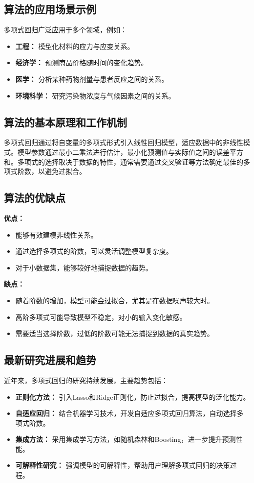\subsection*{算法的应用场景示例}
多项式回归广泛应用于多个领域，例如：
\begin{itemize}
    \item \textbf{工程：} 模型化材料的应力与应变关系。
    \item \textbf{经济学：} 预测商品价格随时间的变化趋势。
    \item \textbf{医学：} 分析某种药物剂量与患者反应之间的关系。
    \item \textbf{环境科学：} 研究污染物浓度与气候因素之间的关系。
\end{itemize}

\subsection*{算法的基本原理和工作机制}
多项式回归通过将自变量的多项式形式引入线性回归模型，适应数据中的非线性模式。模型参数通过最小二乘法进行估计，最小化预测值与实际值之间的误差平方和。多项式的选择取决于数据的特性，通常需要通过交叉验证等方法确定最佳的多项式阶数，以避免过拟合。

\subsection*{算法的优缺点}
\textbf{优点：}
\begin{itemize}
    \item 能够有效建模非线性关系。
    \item 通过选择多项式的阶数，可以灵活调整模型复杂度。
    \item 对于小数据集，能够较好地捕捉数据的趋势。
\end{itemize}

\textbf{缺点：}
\begin{itemize}
    \item 随着阶数的增加，模型可能会过拟合，尤其是在数据噪声较大时。
    \item 高阶多项式可能导致模型不稳定，对小的输入变化敏感。
    \item 需要适当选择阶数，过低的阶数可能无法捕捉到数据的真实趋势。
\end{itemize}

\subsection*{最新研究进展和趋势}
近年来，多项式回归的研究持续发展，主要趋势包括：
\begin{itemize}
    \item \textbf{正则化方法：} 引入Lasso和Ridge正则化，防止过拟合，提高模型的泛化能力。
    \item \textbf{自适应回归：} 结合机器学习技术，开发自适应多项式回归算法，自动选择多项式阶数。
    \item \textbf{集成方法：} 采用集成学习方法，如随机森林和Boosting，进一步提升预测性能。
    \item \textbf{可解释性研究：} 强调模型的可解释性，帮助用户理解多项式回归的决策过程。
\end{itemize}

